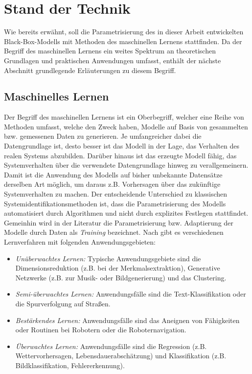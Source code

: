 \chapter{Stand der Technik}

Wie bereits erwähnt, soll die Parametrisierung des in dieser Arbeit entwickelten Black-Box-Modells mit Methoden des maschinellen Lernens stattfinden. Da der Begriff des maschinellen Lernens ein weites Spektrum an theoretischen Grundlagen und praktischen Anwendungen umfasst, enthält der nächste Abschnitt grundlegende Erläuterungen zu diesem Begriff.


\section{Maschinelles Lernen}

Der Begriff des maschinellen Lernens ist ein Oberbegriff, welcher eine Reihe von Methoden umfasst, welche den Zweck haben, Modelle auf Basis von gesammelten bzw. gemessenen Daten zu generieren. Je umfangreicher dabei die Datengrundlage ist, desto besser ist das Modell in der Lage, das Verhalten des realen Systems abzubilden.  Darüber hinaus ist das erzeugte Modell fähig, das Systemverhalten über die verwendete Datengrundlage hinweg zu verallgemeinern. Damit ist die Anwendung des Modells auf bisher unbekannte Datensätze derselben Art möglich, um daraus z.B. Vorhersagen über das zukünftige Systemverhalten zu machen.  Der entscheidende Unterschied zu klassischen Systemidentifikationsmethoden ist, dass die Parametrisierung des Modells automatisiert durch Algorithmen und nicht durch explizites Festlegen stattfindet. \cite{Duriez.2017} \\

Gemeinhin wird in der Literatur die Parametrisierung bzw. Adaptierung der Modelle durch Daten als \textit{Training} bezeichnet. Nach \cite{Dobel.2018} gibt es verschiedenen Lernverfahren mit folgenden Anwendungsgebieten:

\begin{itemize}
	\item \textit{Unüberwachtes Lernen:} Typische Anwendungsgebiete sind die Dimensionsreduktion (z.B. bei der Merkmalsextraktion), Generative Netzwerke (z.B. zur Musik- oder Bildgenerierung) und das Clustering.
	\item \textit{Semi-überwachtes Lernen:} Anwendungsfälle sind die Text-Klassifikation oder die Spurverfolgung auf Straßen.
	\item \textit{Bestärkendes Lernen:} Anwendungsfälle sind das Aneignen von Fähigkeiten oder Routinen bei Robotern oder die Roboternavigation.
	\item \textit{Überwachtes Lernen:} Anwendungsfälle sind die Regression (z.B. Wettervorhersagen, Lebensdauerabschätzung) und Klassifikation (z.B. Bildklassifikation, Fehlererkennung). \cite{Dobel.2018}
\end{itemize} 

